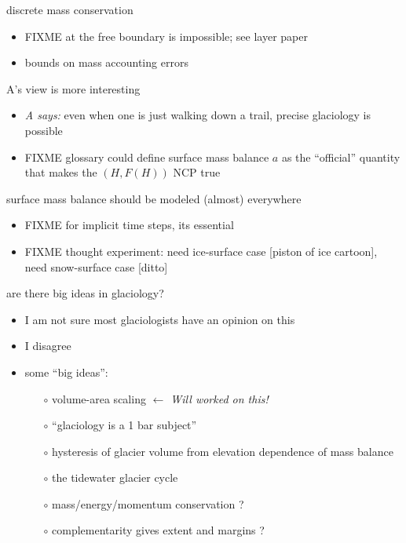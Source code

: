 \documentclass[10pt,hyperref,dvipsnames]{beamer}
\begin{document}
\begin{frame}{discrete mass conservation}
\begin{itemize}
\item FIXME at the free boundary is impossible; see layer paper
\item bounds on mass accounting errors
\end{itemize}
\end{frame}

\begin{frame}{A's view is more interesting}
\begin{itemize}
\item \emph{A says:} even when one is just walking down a trail, precise glaciology is possible
\item FIXME glossary could define surface mass balance $a$ as the ``official'' quantity that makes the $(H,F(H))$ NCP true
\end{itemize}
\end{frame}

\begin{frame}{surface mass balance should be modeled (almost) everywhere}
\begin{itemize}
\item FIXME for implicit time steps, its essential
\item FIXME thought experiment: need ice-surface case [piston of ice cartoon], need snow-surface case [ditto]
\end{itemize}
\end{frame}


\begin{frame}{are there big ideas in glaciology?}
\begin{itemize}
\item I am not sure most glaciologists have an opinion on this
\item I disagree

\bigskip
\item<2> some ``big ideas'':
    \begin{itemize}
    \item[$\circ$] volume-area scaling \quad \emph{$\longleftarrow$ Will worked on this!}
    \item[$\circ$] ``glaciology is a 1 bar subject''
    \item[$\circ$] hysteresis of glacier volume from elevation dependence of mass balance
    \item[$\circ$] the tidewater glacier cycle
    \item[$\circ$] mass/energy/momentum conservation \quad ?
    \item[$\circ$] complementarity gives extent and margins \quad ?
    \end{itemize}
\end{itemize}
\end{frame}
\end{document}
